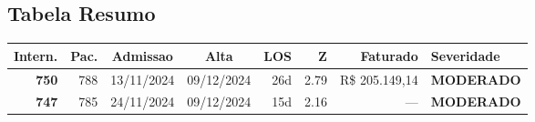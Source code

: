 \documentclass[a4paper,10pt]{article}
\begin{document}
\subsection{Tabela Resumo}
\begin{center}
\begin{longtable}{>{\scriptsize}r>{\scriptsize}r>{\scriptsize}c>{\scriptsize}c>{\scriptsize}r>{\scriptsize}r>{\scriptsize}r>{\scriptsize}l}
\toprule
\textbf{Intern.} & \textbf{Pac.} & \textbf{Admissao} & \textbf{Alta} & \textbf{LOS} & \textbf{Z} & \textbf{Faturado} & \textbf{Severidade} \\
\midrule
\endhead
\bottomrule
\endfoot

\textcolor{anomyellow}{\textbf{750}} & 788 & 13/11/2024 & 09/12/2024 & 26d & \textcolor{anomyellow}{2.79} & R\$ 205.149,14 & \textcolor{anomyellow}{\textbf{MODERADO}} \\

\textcolor{anomyellow}{\textbf{747}} & 785 & 24/11/2024 & 09/12/2024 & 15d & \textcolor{anomyellow}{2.16} & --- & \textcolor{anomyellow}{\textbf{MODERADO}} \\

\end{longtable}\end{center}
\end{document}
